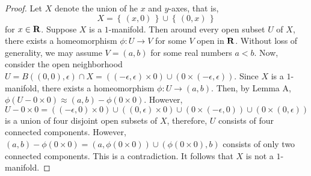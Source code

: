 \begin{proof}
Let $X$ denote the union of he $x$ and $y$-axes, that is,
\[
X=\left\{\,(x,0)\,\right\}\cup\left\{\,(0,x)\,\right\}
\]
for $x\in\mathbf{R}$. Suppose $X$ is a $1$-manifold. Then around every
open subset $U$ of $X$, there exists a homeomorphism
$\phi\colon U\to V$ for some $V$ open in $\mathbf{R}$. Without loss of
generality, we may assume $V=(a,b)$ for some real numbers
$a<b$. Now, consider the open neighborhood
$U=B((0,0),\epsilon)\cap X=((-\epsilon,\epsilon)\times
0)\cup(0\times(-\epsilon,\epsilon))$. Since $X$ is a
$1$-manifold, there exists a homeomorphism $\phi\colon U\to
(a,b)$. Then, by Lemma A, $\phi(U-0\times 0)\approx
(a,b)-\phi(0\times 0)$. However,
\[
U-0\times 0=((-\epsilon,0)\times 0)\cup((0,\epsilon)\times 0)\cup(0\times(-\epsilon,0))\cup(0\times(0,\epsilon))
\]
is a union of four disjoint open subsets of $X$, therefore, $U$
consists of four connected components. However,
$(a,b)-\phi(0\times 0)=(a,\phi(0\times 0))\cup(\phi(0\times
0),b)$ consists of only two connected components. This is a
contradiction. It follows that $X$ is not a $1$-manifold.
\end{proof}

